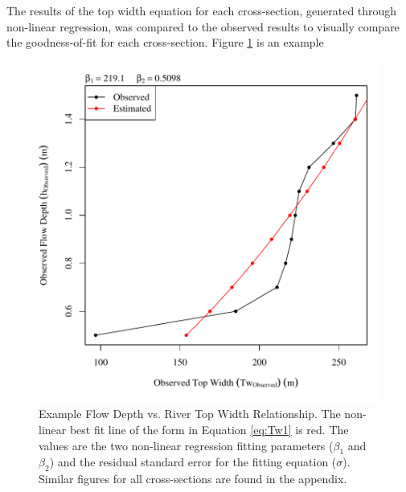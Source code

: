 The results of the top width equation for each cross-section, generated through non-linear regression, was compared to the observed results to visually compare the goodness-of-fit for each cross-section.  Figure \ref{fig:exampleTwVsH} is an example
\begin{figure}[htbp]
	\centering
	\includegraphics[width=6in]{"Figures/Results_USR/Stochastic/Survey Tw vs H-Section 1"}
	\caption[Example Flow Depth vs. River Top Width Relationship.]{Example Flow Depth vs. River Top Width Relationship.  The non-linear best fit line of the form in Equation \ref{eq:Tw1} is red.  The values are the two non-linear regression fitting parameters ($\beta_1$ and $\beta_2$) and the residual standard error for the fitting equation ($\sigma$).  Similar figures for all cross-sections are found in the appendix.}
	\label{fig:exampleTwVsH}
\end{figure}

